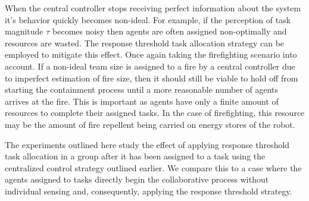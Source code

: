 \documentclass[defaultstyle,12pt]{thesis}
\newcommand{\Sig}{\mathcal{S}}  %
\begin{document}

When the central controller stops receiving perfect information about the system it's behavior quickly becomes non-ideal. For example, if the perception of task magnitude $\tau$ becomes noisy then agents are often assigned non-optimally and resources are wasted. The response threshold task allocation strategy can be employed to mitigate this effect. Once again taking the firefighting scenario into account. If a non-ideal team size is assigned to a fire by a central controller due to imperfect estimation of fire size, then it should still be viable to hold off from starting the containment process until a more reasonable number of agents arrives at the fire. This is important as agents have only a finite amount of resources to complete their assigned tasks. In the case of firefighting, this resource may be the amount of fire repellent being carried on energy stores of the robot.

The experiments outlined here study the effect of applying response threshold task allocation in a group after it has been assigned to a task using the centralized control strategy outlined earlier. We compare this to a case where the agents assigned to tasks directly begin the collaborative process without individual sensing and, consequently, applying the response threshold strategy. 
\end{document}
